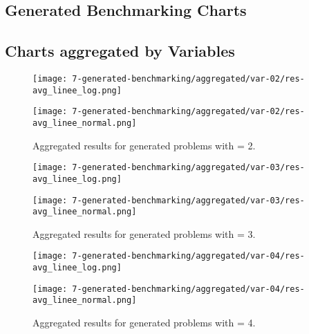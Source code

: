 
\newpage\pagestyle{appendices}
\begin{appendices}

\chapter{Generated Benchmarking Charts}\label{app:generated-benchmarking}
\section{Charts aggregated by Variables}\label{app:charts-by-variables}
\begin{figure}[H]
  \centering
  \begin{minipage}{0.8\textwidth}
    \centering
    \texttt{[image: 7-generated-benchmarking/aggregated/var-02/res-avg\_linee\_log.png]}
  \end{minipage}
  \hfill
  \begin{minipage}{0.8\textwidth}
    \centering
    \texttt{[image: 7-generated-benchmarking/aggregated/var-02/res-avg\_linee\_normal.png]}
  \end{minipage}
  \caption{Aggregated results for generated problems with  = 2.}\label{fig:app-agg-var2}
\end{figure}

\begin{figure}[H]
  \centering
  \begin{minipage}{1\textwidth}
    \centering
    \texttt{[image: 7-generated-benchmarking/aggregated/var-03/res-avg\_linee\_log.png]}
  \end{minipage}
  \hfill
  \begin{minipage}{1\textwidth}
    \centering
    \texttt{[image: 7-generated-benchmarking/aggregated/var-03/res-avg\_linee\_normal.png]}
  \end{minipage}
  \caption{Aggregated results for generated problems with  = 3.}\label{fig:app-agg-var3}
\end{figure}

\begin{figure}[H]
  \centering
  \begin{minipage}{1\textwidth}
    \centering
    \texttt{[image: 7-generated-benchmarking/aggregated/var-04/res-avg\_linee\_log.png]}
  \end{minipage}
  \hfill
  \begin{minipage}{1\textwidth}
    \centering
    \texttt{[image: 7-generated-benchmarking/aggregated/var-04/res-avg\_linee\_normal.png]}
  \end{minipage}
  \caption{Aggregated results for generated problems with  = 4.}\label{fig:app-agg-var4}
\end{figure}


\end{appendices}
